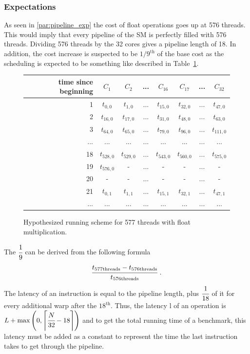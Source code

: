 \documentclass{report}
\begin{document}
	\subsubsection{Expectations}
	As seen in \ref{par:pipeline_exp} the cost of float
    operations goes up at 576 threads. This would imply that every pipeline of
    the SM is perfectly filled with 576 threads. Dividing 576 threads by
    the 32 cores gives a pipeline length of 18. In addition, the cost increase
    is suspected to be $1/9^\text{th}$ of the base cost as the scheduling is expected to be
    something like described in Table~\ref{fig:fp_prediction_513}.
    
    \begin{figure}[H]
      \centering
       \begin{tabular}{ | r || c | c | c | c || c | c | c | }
    	    \hline
    	    time since beginning & $C_1$ & $C_2$ & ... & $C_{16}$ & $C_{17}$ & ... & $C_{32}$ \\ \hline  \hline
    	   1 & $t_{0,0}$ & $t_{1,0}$ & ... & $t_{15,0}$ & $t_{32, 0}$ & ... & $t_{47, 0}$ \\ \hline 
    	   2 & $t_{16,0}$ & $t_{17,0}$ & ... & $t_{31,0}$ & $t_{48, 0}$ & ... & $t_{63, 0}$ \\ \hline
    	   3 & $t_{64,0}$ & $t_{65,0}$ & ... & $t_{79,0}$ & $t_{96, 0}$ & ... & $t_{111, 0}$ \\ \hline
    	   ... & ... & ... & ... & ... & ... & ... & ... \\ \hline
    	   18 & $t_{528,0}$ & $t_{529,0}$ & ... & $t_{543,0}$ & $t_{560,0}$ & ... & $t_{575, 0}$ \\ \hline
    	   19 & $t_{576,0}$ & - & ... & - & - & ... & - \\ \hline
    	   20 & - & - & ... & - & - & ... & - \\ \hline
    	   21 & $t_{0,1}$ & $t_{1,1}$ & ... & $t_{15,1}$ & $t_{32,1}$ & ... & $t_{47,1}$ \\ \hline
    	   ... & ... & ... & ... & ... & ... & ... & ... \\ \hline
  	\end{tabular}
  	\captionsetup{justification=centering}
  	\caption{Hypothesized running scheme for 577 threads with float multiplication.}
  	\label{fig:fp_prediction_513}
   \end{figure}

    The $\cfrac{1}{9}$ can be derived from the following formula
    \[ \cfrac{t_{\text{577threads}} - t_{\text{576threads}}}{t_{\text{576threads}}} \text{  .}\]
    The latency of an instruction is equal to the pipeline length, plus $\cfrac{1}{18}$ of
    it for every additional warp after the $18^{\text{th}}$. Thus, the latency l of an 
    operation is $L + \text{max}\left(0, \left\lceil{\cfrac{N}{32} -18}\right\rceil\right)$ and to get the total
    running time of a benchmark, this latency must be added as a constant to
    represent the time the last instruction takes to get through the pipeline.
\end{document}
